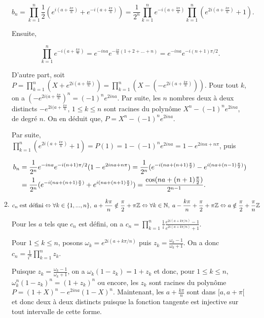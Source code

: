 \documentclass[11pt,a4paper]{article}
\newcommand{\Nn}{\mathbb{N}} \newcommand{\N}{\mathbb{N}}
\newcommand{\Zz}{\mathbb{Z}} \newcommand{\Z}{\mathbb{Z}}
\begin{document}
\begin{enumerate}
$$b_n=\prod_{k=1}^{n}\frac{1}{2}(e^{i(a+\frac{k\pi}{n})}+e^{-i(a+\frac{k\pi}{n})})=\frac{1}{2^n}\prod_{k=1}^{n}e^{-i(a+\frac{k\pi}{n})}\prod_{k=1}^{n}(e^{2i(a+\frac{k\pi}{n})}+1).$$

Ensuite, 

$$\prod_{k=1}^{n}e^{-i(a+\frac{k\pi}{n})}=e^{-ina}e^{-\frac{i\pi}{n}(1+2+...+n)}=e^{-ina}e^{-i(n+1)\pi/2}.$$

D'autre part, soit $P=\prod_{k=1}^{n}(X+e^{2i(a+\frac{k\pi}{n})})=\prod_{k=1}^{n}(X-(-e^{2i(a+\frac{k\pi}{n})}))$.
Pour tout $k$, on a $(-e^{2i(a+\frac{k\pi}{n}})^n=(-1)^ne^{2ina}$. Par suite, les $n$ nombres deux à deux distincts $-e^{2i(a+\frac{k\pi}{n}}$, $1\leq k\leq n$ sont racines du polynôme $X^n-(-1)^ne^{2ina}$, de degré $n$. On en déduit que, $P=X^n-(-1)^ne^{2ina}$.

Par suite, $\prod_{k=1}^{n}(e^{2i(a+\frac{k\pi}{n})}+1)=P(1)=1-(-1)^ne^{2ina}=1-e^{2ina+n\pi}$, puis 

\begin{align*}\ensuremath
b_n&=\frac{1}{2^n}e^{-ina}e^{-i(n+1)\pi/2}(1-e^{2ina+n\pi})=\frac{1}{2^n}(e^{-i(na+(n+1)\frac{\pi}{2})}-e^{i(na+(n-1)\frac{\pi}{2})})\\
 &=\frac{1}{2^n}(e^{-i(na+(n+1)\frac{\pi}{2})}+e^{i(na+(n+1)\frac{\pi}{2})})=\frac{\cos(na+(n+1)\frac{\pi}{2})}{2^{n-1}}.
\end{align*}

\item  
\begin{align*}\ensuremath
c_n\;\mbox{est défini}\Leftrightarrow\forall k\in\{1,...,n\},\;a+\frac{k\pi}{n}\notin\frac{\pi}{2}+\pi\Zz\Leftrightarrow\forall k\in\Nn,\;a-\frac{k\pi}{n}+\frac{\pi}{2}+\pi\Zz\Leftrightarrow a\notin\frac{\pi}{2}+\frac{\pi}{n}\Zz
\end{align*}

Pour les $a$ tels que $c_n$ est défini, on a $c_n=\prod_{k=1}^{n}\frac{1}{i}\frac{e^{2i(a+k\pi/n)}-1}{e^{2i(a+k\pi/n)}+1}$.

Pour $1\leq k\leq n$, posons $\omega_k=e^{2i(a+k\pi/n)}$ puis $z_k=\frac{\omega_k-1}{\omega_k+1}$. On a donc $c_n=\frac{1}{i^n}\prod_{k=1}^{n}z_k$.

Puisque $z_k=\frac{\omega_k-1}{\omega_k+1}$, on a $\omega_k(1-z_k)=1+z_k$ et donc, pour $1\leq k\leq n$, $\omega_k^n(1-z_k)^n=(1+z_k)^n$ ou encore, les $z_k$ sont racines du polynôme $P=(1+X)^n-e^{2ina}(1-X)^n$. Maintenant, les $a+\frac{k\pi}{n}$ sont dans $[a,a+\pi[$ et donc deux à deux distincts puisque la fonction tangente est injective sur tout intervalle de cette forme.


\end{enumerate}
\end{document}
